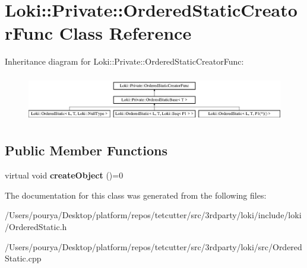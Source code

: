 \hypertarget{classLoki_1_1Private_1_1OrderedStaticCreatorFunc}{}\section{Loki\+:\+:Private\+:\+:Ordered\+Static\+Creator\+Func Class Reference}
\label{classLoki_1_1Private_1_1OrderedStaticCreatorFunc}
Inheritance diagram for Loki\+:\+:Private\+:\+:Ordered\+Static\+Creator\+Func\+:\begin{figure}[H]
\begin{center}
\leavevmode
\includegraphics[height=2.051282cm]{classLoki_1_1Private_1_1OrderedStaticCreatorFunc}
\end{center}
\end{figure}
\subsection*{Public Member Functions}
\begin{DoxyCompactItemize}
\item 
\hypertarget{classLoki_1_1Private_1_1OrderedStaticCreatorFunc_a0491d07c99821b7c4a36f038de0b43dc}{}virtual void {\bfseries create\+Object} ()=0\label{classLoki_1_1Private_1_1OrderedStaticCreatorFunc_a0491d07c99821b7c4a36f038de0b43dc}

\end{DoxyCompactItemize}


The documentation for this class was generated from the following files\+:\begin{DoxyCompactItemize}
\item 
/\+Users/pourya/\+Desktop/platform/repos/tetcutter/src/3rdparty/loki/include/loki/Ordered\+Static.\+h\item 
/\+Users/pourya/\+Desktop/platform/repos/tetcutter/src/3rdparty/loki/src/Ordered\+Static.\+cpp\end{DoxyCompactItemize}
